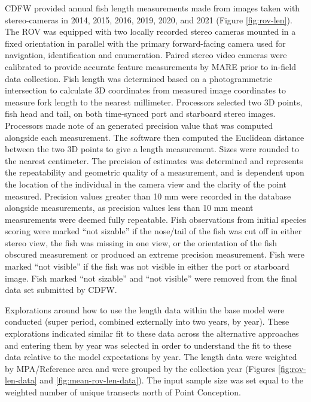 \documentclass[11pt,
  english,
  letterpaper,
]{article}
\begin{document}
CDFW provided annual fish length measurements made from images taken with stereo-cameras in 2014, 2015, 2016, 2019, 2020, and 2021 (Figure \ref{fig:rov-len}). The ROV was equipped with two locally recorded stereo cameras mounted in a fixed orientation in parallel with the primary forward-facing camera used for navigation, identification and enumeration. Paired stereo video cameras were calibrated to provide accurate feature measurements by MARE prior to in-field data collection. Fish length was determined based on a photogrammetric intersection to calculate 3D coordinates from measured image coordinates to measure fork length to the nearest millimeter. Processors selected two 3D points, fish head and tail, on both time-synced port and starboard stereo images. Processors made note of an generated precision value that was computed alongside each measurement. The software then computed the Euclidean distance between the two 3D points to give a length measurement. Sizes were rounded to the nearest centimeter. The precision of estimates was determined and represents the repeatability and geometric quality of a measurement, and is dependent upon the location of the individual in the camera view and the clarity of the point measured. Precision values greater than 10 mm were recorded in the database alongside measurements, as precision values less than 10 mm meant measurements were deemed fully repeatable. Fish observations from initial species scoring were marked ``not sizable'' if the nose/tail of the fish was cut off in either stereo view, the fish was missing in one view, or the orientation of the fish obscured measurement or produced an extreme precision measurement. Fish were marked ``not visible'' if the fish was not visible in either the port or starboard image. Fish marked ``not sizable'' and ``not visible'' were removed from the final data set submitted by CDFW.

Explorations around how to use the length data within the base model were conducted (super period, combined externally into two years, by year). These explorations indicated similar fit to these data across the alternative approaches and entering them by year was selected in order to understand the fit to these data relative to the model expectations by year. The length data were weighted by MPA/Reference area and were grouped by the collection year (Figures \ref{fig:rov-len-data} and \ref{fig:mean-rov-len-data}). The input sample size was set equal to the weighted number of unique transects north of Point Conception.
\end{document}
